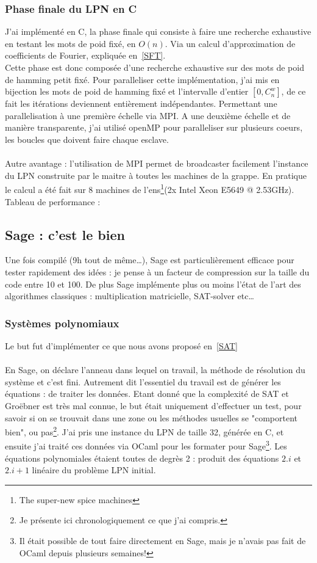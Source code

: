 \documentclass{article}		%
\theoremstyle{definition}
\theoremstyle{plain}
\begin{document}
\subsubsection{Phase finale du LPN en C}
J'ai implémenté en C, la phase finale qui consiste à faire une recherche
exhaustive en testant les mots de poid fixé, en $O(n)$. Via un calcul
d'approximation de coefficients de Fourier, expliquée en~\ref{SFT}.
\\
Cette phase est donc composée d'une recherche exhaustive sur des mots de
poid de hamming petit fixé. Pour paralleliser cette implémentation, j'ai
mis en bijection les mots de poid de hamming fixé et l'intervalle
d'entier $[0, C_{n}^{w}]$, de ce fait les itérations deviennent
entièrement indépendantes. Permettant une parallelisation à une première
échelle via MPI.
A une deuxième échelle et de manière transparente, j'ai utilisé openMP
pour paralleliser sur plusieurs coeurs, les boucles que doivent faire
chaque esclave. 
\\\\
Autre avantage : l'utilisation de MPI permet de broadcaster facilement
l'instance du LPN construite par le maitre à toutes les machines de la
grappe. En pratique le calcul a été fait sur 8 machines de
l'ens\footnote{The super-new spice machines}(2x Intel Xeon E5649 @
2.53GHz).  
Tableau de performance :

\subsection{Sage : c'est le bien}
Une fois compilé (9h tout de même\dots), Sage est particulièrement efficace
pour tester rapidement des idées : je pense à un facteur de compression
sur la taille du code
entre 10 et 100. De plus Sage
implémente plus ou moins l'état de l'art des algorithmes classiques : multiplication
matricielle, SAT-solver etc\dots  


\subsubsection{Systèmes polynomiaux}
Le but fut d'implémenter ce que nous avons proposé en~\ref{SAT}
\\\\
En Sage, on déclare l'anneau dans lequel on travail, la méthode de
résolution du système et c'est fini. Autrement dit l'essentiel du travail
est de générer les équations : de traiter les données. Etant donné que la
complexité de SAT et Groëbner est très mal connue, le but était
uniquement d'effectuer un test, pour savoir si on se trouvait dans une
zone ou les méthodes usuelles se "comportent bien", ou pas\footnote{Je
présente ici chronologiquement ce que j'ai compris.}.
J'ai pris une instance du LPN de taille 32, générée en C, et ensuite j'ai
traité ces données via OCaml pour les formater pour Sage\footnote{Il
était possible de tout faire directement en Sage, mais je n'avais pas
fait de OCaml depuis plusieurs semaines!}. Les équations polynomiales
étaient toutes de degrès 2 : produit des équations $2.i$ et $2.i+1$
linéaire du problème LPN initial.
\end{document}
